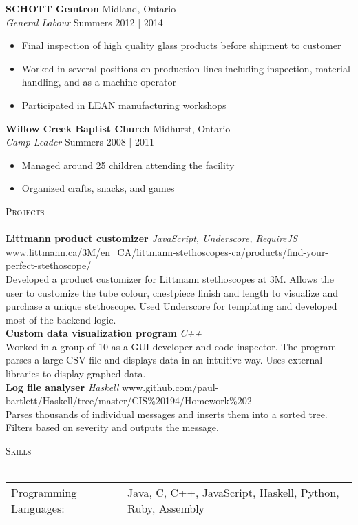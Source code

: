 \documentclass[a4paper]{article}
\newcommand{\lineunder} {
    \vspace*{-8pt} \\
    \hspace*{-18pt} \hrulefill \\
}
\newcommand{\header} [1] {
    {\hspace*{-18pt}\vspace*{6pt} \textsc{#1}}
    \vspace*{-6pt} \lineunder
}
\begin{document}
\textbf{SCHOTT Gemtron} \hfill Midland, Ontario\\
\textit{General Labour} \hfill Summers 2012 | 2014\\
\vspace{-1mm}
\begin{itemize} \itemsep 1pt
	\item Final inspection of high quality glass products before shipment to customer
	\item Worked in several positions on production lines including inspection, material handling, and as a machine operator
	\item Participated in LEAN manufacturing workshops
\end{itemize}

\textbf{Willow Creek Baptist Church} \hfill Midhurst, Ontario\\
\textit{Camp Leader} \hfill Summers 2008 | 2011\\
\vspace{-1mm}
\begin{itemize} \itemsep 1pt
	\item Managed around 25 children attending the facility
	\item Organized crafts, snacks, and games
\end{itemize}

\header{Projects}

{\textbf{Littmann product customizer} \sl JavaScript, Underscore, RequireJS} \hfill \small www.littmann.ca/3M/en\_CA/littmann-stethoscopes-ca/products/find-your-perfect-stethoscope/\\
Developed a product customizer for Littmann stethoscopes at 3M. Allows the user to customize the tube colour, chestpiece finish and length to visualize and purchase a unique stethoscope. Used Underscore for templating and developed most of the backend logic.\\
\vspace*{2mm}
{\textbf{Custom data visualization program} \sl C++} \\
Worked in a group of 10 as a GUI developer and code inspector. The program parses a large CSV file and displays data in an intuitive way. Uses external libraries to display graphed data.\\
\vspace*{2mm}
{\textbf{Log file analyser} \sl Haskell} \hfill \small www.github.com/paul-bartlett/Haskell/tree/master/CIS\%20194/Homework\%202\\
Parses thousands of individual messages and inserts them into a sorted tree. Filters based on severity and outputs the message.\\
\vspace*{2mm}

\vspace*{2mm}
        
\header{Skills}
\begin{tabular}{ l l }
	Programming Languages: & Java, C, C++, JavaScript, Haskell, Python, Ruby, Assembly \\
\end{tabular}

\vspace*{2mm}

\ 
\end{document}
